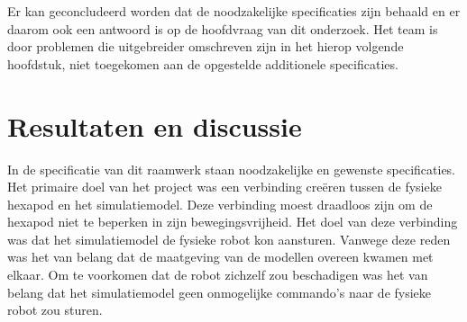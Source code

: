 \documentclass[10pt,a4paper]{article}
\begin{document}
Er kan geconcludeerd worden dat de noodzakelijke specificaties zijn behaald en er daarom ook een antwoord is op de hoofdvraag van dit onderzoek. Het team is door problemen die uitgebreider omschreven zijn in het hierop volgende hoofdstuk, niet toegekomen aan de opgestelde additionele specificaties.
\newpage

\section{Resultaten en discussie}
In de specificatie van dit raamwerk staan noodzakelijke en gewenste specificaties.
Het primaire doel van het project was een verbinding cre\"eren tussen de fysieke hexapod en het simulatiemodel. Deze verbinding moest draadloos zijn om de hexapod niet te beperken in zijn bewegingsvrijheid. Het doel van deze verbinding was dat het simulatiemodel de fysieke robot kon aansturen. Vanwege deze reden was het van belang dat de maatgeving van de modellen overeen kwamen met elkaar. Om te voorkomen dat de robot zichzelf zou beschadigen was het van belang dat het simulatiemodel geen onmogelijke commando's naar de fysieke robot zou sturen.
\end{document}

